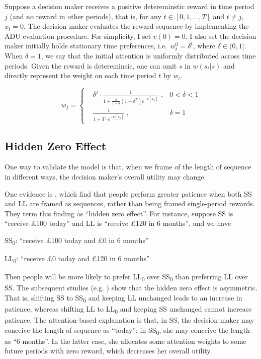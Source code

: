 \documentclass[
  12pt,
]{article}
\begin{document}
Suppose a decision maker receives a positive detereminstic reward in
time period \(j\) (and no reward in other periods), that is, for any
\(t\in[0,1,…,T]\) and \(t \neq j\), \(x_t = 0\). The decision maker
evaluates the reward sequence by implementing the ADU evaluation
procedure. For simplicity, I set \(v(0)=0\). I also set the decision
maker initially holds stationary time preferences,
i.e.~\(w^0_t=\delta^t\), where \(\delta\in(0,1]\). When \(\delta=1\), we
say that the initial attention is uniformly distributed across time
periods. Given the reward is detereminsic, one can omit \(s\) in
\(w(s_t|s)\) and directly represent the weight on each time period \(t\)
by \(w_t\).

\[ 
w_j = \left\{ \begin{aligned}
& \delta^j \cdot\frac{1}{1+\frac{\delta}{1-\delta}(1-\delta^T)e^{-v(x_j)}}\;, & 0<\delta<1 \\
& \frac{1}{1+T\cdot e^{-v(x_j)}}\; , & \delta=1
\end{aligned}
\right.
\]

\hypertarget{hidden-zero-effect}{%
\subsection{Hidden Zero Effect}\label{hidden-zero-effect}}

One way to validate the model is that, when we frame of the length of
sequence in different ways, the decision maker's overall utility may
change.

One evidence is \citet{magen_hidden-zero_2008}, which find that people
perform greater patience when both SS and LL are framed as sequences,
rather than being framed single-period rewards. They term this finding
as ``hidden zero effect''. For instance, suppose SS is ``receive £100
today'' and LL is ``receive £120 in 6 months'', and we have

SS\textsubscript{0}: ``receive £100 today and £0 in 6 months''

LL\textsubscript{0}: ``receive £0 today and £120 in 6 months''

Then people will be more likely to prefer LL\textsubscript{0} over
SS\textsubscript{0} than preferring LL over SS. The subsequent studies
(e.g. \citet{read_value_2017}) show that the hidden zero effect is
asymmetric. That is, shifting SS to SS\textsubscript{0} and keeping LL
unchanged leads to an increase in patience, whereas shifting LL to
LL\textsubscript{0} and keeping SS unchanged cannot increase patience.
The attention-based explanation is that, in SS, the decision maker may
conceive the length of sequence as ``today''; in SS\textsubscript{0},
she may conceive the length as ``6 months''. In the latter case, she
allocates some attention weights to some future periods with zero
reward, which decreases her overall utility.
\end{document}
